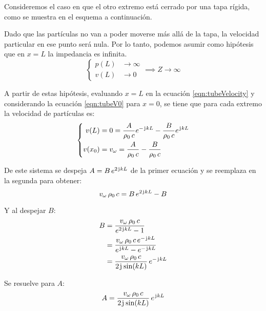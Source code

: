 \documentclass[a5paper,12pt,twoside]{book}
\begin{document}
Consideremos el caso en que el otro extremo está cerrado por una tapa rígida, como se muestra en el esquema a continuación.

\begin{center}
    \def\svgwidth{0.6\linewidth}
    
\end{center}

Dado que las partículas no van a poder moverse más allá de la tapa, la velocidad particular en ese punto será nula.
Por lo tanto, podemos asumir como hipótesis que en $x=L$ la impedancia es infinita.
\begin{equation*}
    \left\{
    \begin{aligned}
        p(L) &\to \infty
        \\
        v(L) &\to 0
    \end{aligned}
    \right.
    \implies
    Z \to \infty
\end{equation*}

A partir de estas hipótesis, evaluando $x=L$ en la ecuación \ref{eqn:tubeVelocity} y considerando la ecuación \ref{eqn:tubeV0} para $x=0$, se tiene que para cada extremo la velocidad de partículas es:
\begin{equation*}
    \left\{
    \begin{aligned}
        v(L) &= 0 = \frac{A}{\rho_0 \, c} e^{-\mkern2mu\mathrm{j}\mkern1mu k L} - \frac{B}{\rho_0 \, c} e^{\mkern2mu\mathrm{j}\mkern1mu k L}
        \\
        v(x_0) &= v_\omega = \frac{A}{\rho_0 \, c} - \frac{B}{\rho_0 \, c}
    \end{aligned}
    \right.
\end{equation*}

De este sistema se despeja $A = B \, e^{2 \mkern2mu\mathrm{j}\mkern1mu kL}$ de la primer ecuación y se reemplaza en la segunda para obtener:
\begin{equation*}
    v_\omega \, \rho_0 \, c = B \, e^{2 \mkern2mu\mathrm{j}\mkern1mu kL} - B
\end{equation*}

Y al despejar $B$:
\begin{align*}
    B &= \frac{v_\omega \, \rho_0 \, c}{e^{2 \mkern2mu\mathrm{j}\mkern1mu kL}-1}
    \\
    &= \frac{v_\omega \, \rho_0 \, c \, e^{-\mkern2mu\mathrm{j}\mkern1mu kL}}{e^{\mkern2mu\mathrm{j}\mkern1mu kL}-e^{-\mkern2mu\mathrm{j}\mkern1mu kL}}
    \\
    &= \frac{v_\omega \, \rho_0 \, c}{2\mkern2mu\mathrm{j}\mkern1mu \sin(kL)} \, e^{-\mkern2mu\mathrm{j}\mkern1mu kL}
\end{align*}

Se resuelve para $A$:
\begin{equation*}
    A = \frac{v_\omega \, \rho_0 \, c}{2\mkern2mu\mathrm{j}\mkern1mu \sin(kL)} \, e^{\mkern2mu\mathrm{j}\mkern1mu kL}
\end{equation*}
\end{document}
